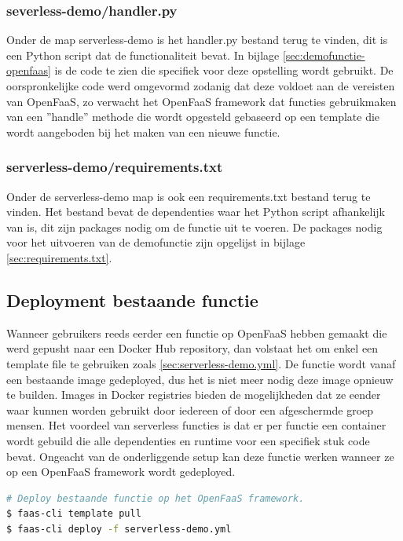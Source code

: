 \subsubsection{severless-demo/handler.py}
Onder de map serverless-demo is het handler.py bestand terug te vinden, dit is een Python script dat de functionaliteit bevat. In bijlage \ref{sec:demofunctie-openfaas} is de code te zien die specifiek voor deze opstelling wordt gebruikt. De oorspronkelijke code werd omgevormd zodanig dat deze voldoet aan de vereisten van OpenFaaS, zo verwacht het OpenFaaS framework dat functies gebruikmaken van een ''handle'' methode die wordt opgesteld gebaseerd op een template die wordt aangeboden bij het maken van een nieuwe functie.

\subsubsection{serverless-demo/requirements.txt}
Onder de serverless-demo map is ook een requirements.txt bestand terug te vinden. Het bestand bevat de dependenties waar het Python script afhankelijk van is, dit zijn packages nodig om de functie uit te voeren. De packages  nodig voor het uitvoeren van de demofunctie zijn opgelijst in bijlage \ref{sec:requirements.txt}.

\subsection{Deployment bestaande functie}
Wanneer gebruikers reeds eerder een functie op OpenFaaS hebben gemaakt die werd gepusht naar een Docker Hub repository, dan volstaat het om enkel een template file te gebruiken zoals \ref{sec:serverless-demo.yml}. De functie wordt vanaf een bestaande image gedeployed, dus het is niet meer nodig deze image opnieuw te builden. Images in Docker registries bieden de mogelijkheden dat ze eender waar kunnen worden gebruikt door iedereen of door een afgeschermde groep mensen. Het voordeel van serverless functies is dat er per functie een container wordt gebuild die alle dependenties en runtime voor een specifiek stuk code bevat. Ongeacht van de onderliggende setup kan deze functie werken wanneer ze op een OpenFaaS framework wordt gedeployed.

\begin{lstlisting}[language=bash]
# Deploy bestaande functie op het OpenFaaS framework.
$ faas-cli template pull
$ faas-cli deploy -f serverless-demo.yml
\end{lstlisting}

